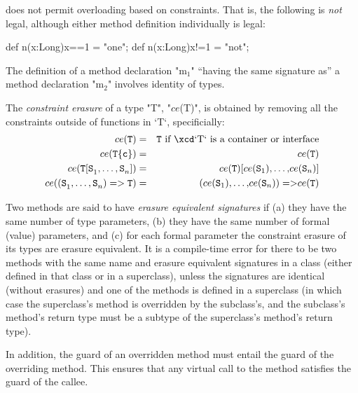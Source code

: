 \XtenCurrVer{} does not permit overloading based on constraints. That is, the
following is {\em not} legal, although either method definition individually
is legal:
\begin{xten}
   def n(x:Long){x==1} = "one";
   def n(x:Long){x!=1} = "not";
\end{xten}




The definition of a method declaration \xcdmath"m$_1$" ``having the same signature
as'' a method declaration \xcdmath"m$_2$" involves identity of types. 



The {\em constraint erasure} of a type \xcdmath"T", 
\xcdmath"$ce$(T)",
is obtained by removing all the constraints outside of functions in \xcd`T`,
specificially: 
\begin{eqnarray}
ce({\tt T}) &=& {\tt T} \mbox{ if \xcd`T` is a container or interface}\\
ce({\tt T\{c\}}) &=& ce({\tt T})\\
ce({\tt T[S}_1{\tt,}\ldots{\tt,S}_n{\tt ]})
  &=&
ce({\tt T}){\tt [} ce({\tt S}_1){\tt,}\ldots{\tt,} ce({\tt S}_n){\tt ]}\\
ce({\tt (S}_1{\tt,}\ldots{\tt,S}_n{\tt ) => T})
  &=&
{\tt }{\tt (} ce({\tt S}_1){\tt,}\ldots{\tt,} ce({\tt S}_n){\tt ) => } 
ce({\tt T})
\end{eqnarray}



 Two methods are said to have {\em erasure equivalent signatures} if (a) they have the
 same number of type parameters, 
(b) they have the same number of formal (value) parameters, and (c)
for each formal parameter the constraint erasure of its types are erasure equivalent.
It is a 
compile-time error for there to be two methods with the same name and
erasure equivalent signatures in a class (either defined in that class or in a
superclass), unless the signatures are identical (without erasures) and one of the methods is
defined in a superclass (in which case the superclass's method is overridden
by the subclass's, and the subclass's method's return type must be a subtype of
the superclass's method's return type).  

 



In addition, the guard of an overridden method
must entail
the guard of the overriding method.   This
ensures that any virtual call to the method
satisfies the guard of the callee.

